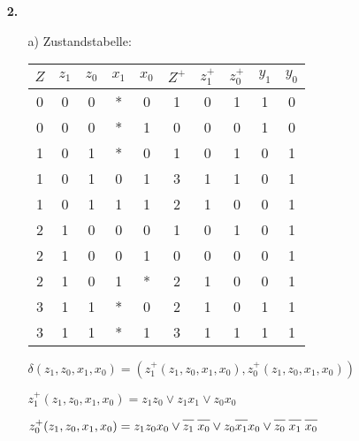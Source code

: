 \documentclass[a4paper,10pt]{scrartcl}
\newcommand*{\oline}[1]{\overline{\vphantom{A}#1}}
\begin{document}
\begin{enumerate}
\begin{enumerate}

        \end{enumerate}
    \item[\textbf{2.}]
        \begin{enumerate}
            \item[a)]
                Zustandstabelle:

                \begin{tabular}{|c|c|c||c|c||c|c|c||c|c|}
                     \hline
                     $Z$ & $z_1$ & $z_0$ & $x_1$ & $x_0$ & $Z^+$ & $z^+_1$ & $z^+_0$ & $y_1$ & $y_0$ \\
                     \hline
                     0 & 0 & 0 & * & 0 & 1 & 0 & 1 & 1 & 0\\
                     0 & 0 & 0 & * & 1 & 0 & 0 & 0 & 1 & 0\\
                     1 & 0 & 1 & * & 0 & 1 & 0 & 1 & 0 & 1\\
                     1 & 0 & 1 & 0 & 1 & 3 & 1 & 1 & 0 & 1\\
                     1 & 0 & 1 & 1 & 1 & 2 & 1 & 0 & 0 & 1\\
                     2 & 1 & 0 & 0 & 0 & 1 & 0 & 1 & 0 & 1\\
                     2 & 1 & 0 & 0 & 1 & 0 & 0 & 0 & 0 & 1\\
                     2 & 1 & 0 & 1 & * & 2 & 1 & 0 & 0 & 1\\
                     3 & 1 & 1 & * & 0 & 2 & 1 & 0 & 1 & 1\\
                     3 & 1 & 1 & * & 1 & 3 & 1 & 1 & 1 & 1\\
                     \hline
                \end{tabular}

                $\delta(z_1, z_0, x_1, x_0) = (z^+_1(z_1, z_0, x_1, x_0), z^+_0(z_1, z_0, x_1, x_0))$

                $z^+_1(z_1, z_0, x_1, x_0) = z_1z_0 \vee z_1x_1 \vee z_0x_0$

                $z^+_0(z_1, z_0, x_1, x_0) = z_1z_0x_0 \vee \oline{z_1}\;\oline{x_0} \vee z_0\oline{x_1}x_0 \vee \oline{z_0}\;\oline{x_1}\;\oline{x_0}$


\end{enumerate}
\end{enumerate}
\end{document}
